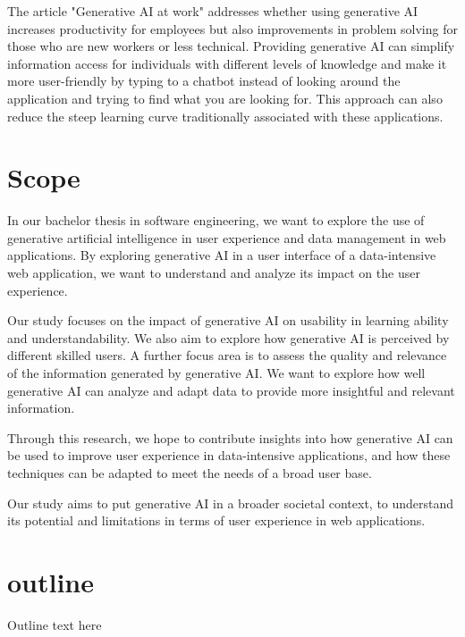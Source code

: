 The article "Generative AI at work"  addresses whether using generative AI increases productivity for employees but also improvements in problem solving for those who are new workers or less technical. Providing generative AI can simplify information access for individuals with different levels of knowledge and make it more user-friendly by typing to a chatbot instead of looking around the application and trying to find what you are looking for. This approach can also reduce the steep learning curve traditionally associated with these applications.

\section{Scope}
In our bachelor thesis in software engineering, we want to explore the use of generative artificial intelligence in user experience and data management in web applications. By exploring generative AI in a user interface of a data-intensive web application, we want to understand and analyze its impact on the user experience.

Our study focuses on the impact of generative AI on usability in learning ability and understandability. We also aim to explore how generative AI is perceived by different skilled users. A further focus area is to assess the quality and relevance of the information generated by generative AI. We want to explore how well generative AI can analyze and adapt data to provide more insightful and relevant information.

Through this research, we hope to contribute insights into how generative AI can be used to improve user experience in data-intensive applications, and how these techniques can be adapted to meet the needs of a broad user base.

Our study aims to put generative AI in a broader societal context, to understand its potential and limitations in terms of user experience in web applications.

\section{outline}
Outline text here
